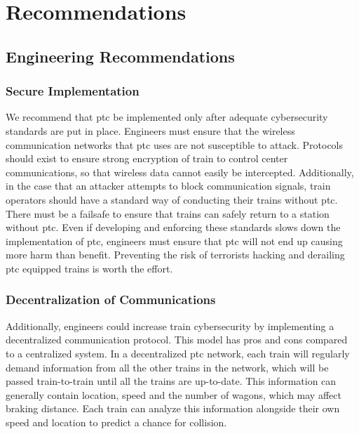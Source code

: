 \documentclass[11pt, titlepage]{article}
\begin{document}
\pagebreak

\section{Recommendations}

\subsection{Engineering Recommendations}

\subsubsection{Secure Implementation}

We recommend that \gls{ptc} be implemented only after adequate cybersecurity
standards are put in place. Engineers must ensure that the wireless communication
networks that \gls{ptc} uses are not susceptible to attack. Protocols should exist
to ensure strong encryption of train to control center communications, so that
wireless data cannot easily be intercepted. Additionally, in the case that an
attacker attempts to block communication signals, train operators should have a
standard way of conducting their trains without \gls{ptc}. There must be a failsafe
to ensure that trains can safely return to a station without \gls{ptc}. Even if
developing and enforcing these standards slows down the implementation of \gls{ptc},
engineers must ensure that \gls{ptc} will not end up causing more harm than benefit.
Preventing the risk of  terrorists hacking and derailing \gls{ptc} equipped trains
is worth the effort.

\subsubsection{Decentralization of Communications}

Additionally, engineers could increase train cybersecurity by implementing a
decentralized communication protocol. This model has pros and cons compared to a
centralized system. In a decentralized \gls{ptc} network, each train will regularly
demand information from all the other trains in the network, which will be passed
train-to-train until all the trains are up-to-date. This information can generally
contain location, speed and the number of wagons, which may affect braking distance.
Each train can analyze this information alongside their own speed and location to
predict a chance for collision.
\end{document}
